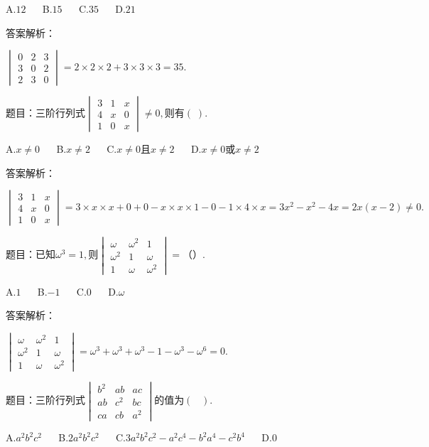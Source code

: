 A.$12$ $\quad$ B.$15$ $\quad$ C.$35$ $\quad$ D.$21$

答案解析：

$\begin{vmatrix}0&2&3\\3&0&2\\2&3&0\end{vmatrix}=2\times2\times2+3\times3\times3=35.$



题目：$\mathrm{三阶行列式}\begin{vmatrix}3&1&x\\4&x&0\\1&0&x\end{vmatrix}\neq0,\mathrm{则有}(\;).$

A.$x\neq0$ $\quad$ B.$x\neq2$ $\quad$ C.$x\neq0且x\neq2$ $\quad$ D.$x\neq0或x\neq2$

答案解析：

$\begin{vmatrix}3&1&x\\4&x&0\\1&0&x\end{vmatrix}=3\times x\times x+0+0-x\times x\times1-0-1\times4\times x=3x^2-x^2-4x=2x(x-2)\neq0.$



题目：$\mathrm{已知}\omega^3=1,则\begin{vmatrix}\omega&\omega^2&1\\\omega^2&1&\omega\\1&\omega&\omega^2\end{vmatrix}=（）.$

A.$1$ $\quad$ B.$-1$ $\quad$ C.$0$ $\quad$ D.$\omega$

答案解析：

$\begin{vmatrix}\omega&\omega^2&1\\\omega^2&1&\omega\\1&\omega&\omega^2\end{vmatrix}=\omega^3+\omega^3+\omega^3-1-\omega^3-\omega^6=0.$



题目：$\mathrm{三阶行列式}\begin{vmatrix}b^2&ab&ac\\ab&c^2&bc\\ca&cb&a^2\end{vmatrix}\mathrm{的值为}(\;\;\;).$

A.$a^2b^2c^2$ $\quad$ B.$2a^2b^2c^2$ $\quad$ C.$3a^2b^2c^2-a^2c^4-b^2a^4-c^2b^4$ $\quad$ D.$0$

